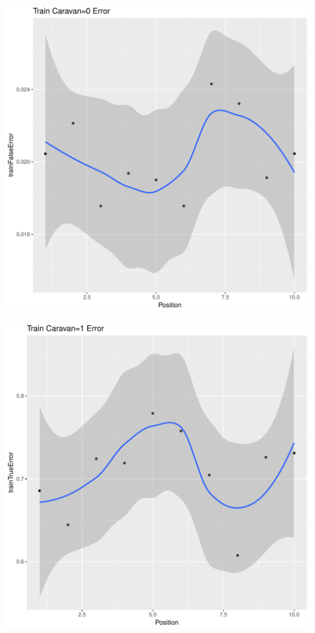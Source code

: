 \documentclass{article}\usepackage[]{graphicx}\usepackage[]{color}
\makeatletter
\def\maxwidth{ %
  \ifdim\Gin@nat@width>\linewidth
    \linewidth
  \else
    \Gin@nat@width
  \fi
}
\newenvironment{kframe}{%
 \def\at@end@of@kframe{}%
 \ifinner\ifhmode%
  \def\at@end@of@kframe{\end{minipage}}%
  \begin{minipage}{\columnwidth}%
 \fi\fi%
 \def\FrameCommand##1{\hskip\@totalleftmargin \hskip-\fboxsep
 \colorbox{shadecolor}{##1}\hskip-\fboxsep
     \hskip-\linewidth \hskip-\@totalleftmargin \hskip\columnwidth}%
 \MakeFramed {\advance\hsize-\width
   \@totalleftmargin\z@ \linewidth\hsize
   \@setminipage}}%
 {\par\unskip\endMakeFramed%
 \at@end@of@kframe}
\newenvironment{knitrout}{}{} %
\makeatother
\begin{document}
\begin{knitrout}
\begin{kframe}
{\ttfamily\noindent\itshape\color{messagecolor}{\#\# `geom\_smooth()` using method = 'loess'}}\end{kframe}
\includegraphics[width=\maxwidth]{figure/unnamed-chunk-39-2} 
\begin{kframe}

{\ttfamily\noindent\itshape\color{messagecolor}{\#\# `geom\_smooth()` using method = 'loess'}}\end{kframe}
\includegraphics[width=\maxwidth]{figure/unnamed-chunk-39-3} 
\begin{kframe}


\end{kframe}
\end{knitrout}
\end{document}
